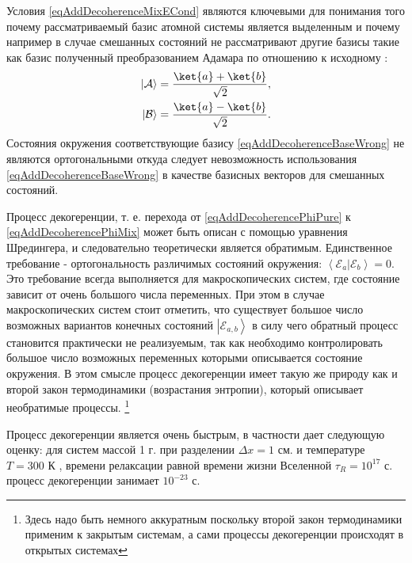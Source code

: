 Условия \eqref{eqAddDecoherenceMixECond} являются ключевыми для
понимания того почему рассматриваемый базис атомной системы является
выделенным и почему например в случае смешанных состояний не
рассматривают другие базисы такие как базис полученный преобразованием
Адамара по отношению к исходному :
\begin{eqnarray}
\left|\mathcal{A}\right> = \frac{\ket{a} + \ket{b}}
              {\sqrt{2}},
\nonumber \\
\left|\mathcal{B}\right> = \frac{\ket{a} - \ket{b}}
              {\sqrt{2}}.
\label{eqAddDecoherenceBaseWrong}
\end{eqnarray}
Состояния окружения соответствующие базису
\eqref{eqAddDecoherenceBaseWrong} не являются ортогональными откуда
следует невозможность использования \eqref{eqAddDecoherenceBaseWrong}
в качестве базисных векторов для смешанных состояний. 

Процесс декогеренции, т. е. перехода от
\eqref{eqAddDecoherencePhiPure} к \eqref{eqAddDecoherencePhiMix} может
быть описан с помощью уравнения Шредингера, и следовательно
теоретически является обратимым. Единственное требование -
ортогональность различимых состояний окружения: 
$\left<\mathcal{E}_a\right.\left|\mathcal{E}_b\right> = 0$. Это
требование всегда выполняется для макроскопических систем, где
состояние зависит от очень большого числа переменных. При этом в
случае макроскопических систем стоит отметить, что существует большое
число возможных вариантов конечных состояний
$\left|\mathcal{E}_{a,b}\right>$ 
в силу чего обратный процесс становится практически не реализуемым,
так как необходимо контролировать большое число возможных
переменных которыми описывается состояние окружения. В этом смысле
процесс декогеренции имеет такую же природу как и второй закон термодинамики 
(возрастания энтропии), который описывает
необратимые процессы.
\footnote{Здесь надо быть немного аккуратным
  поскольку второй закон термодинамики применим к закрытым системам, а
  сами процессы декогеренции происходят в открытых системах}

Процесс декогеренции является очень быстрым, в частности
\cite{bZurek02} дает следующую оценку: для систем массой 1
г. при разделении  $\Delta x = 1 \mbox{ см.}$ и температуре $T=300
\mbox{ К }$, времени релаксации равной времени жизни Вселенной
$\tau_R = 10^{17} \mbox{ с. }$ процесс декогеренции занимает $10^{-23}
\mbox{ с. }$ 

